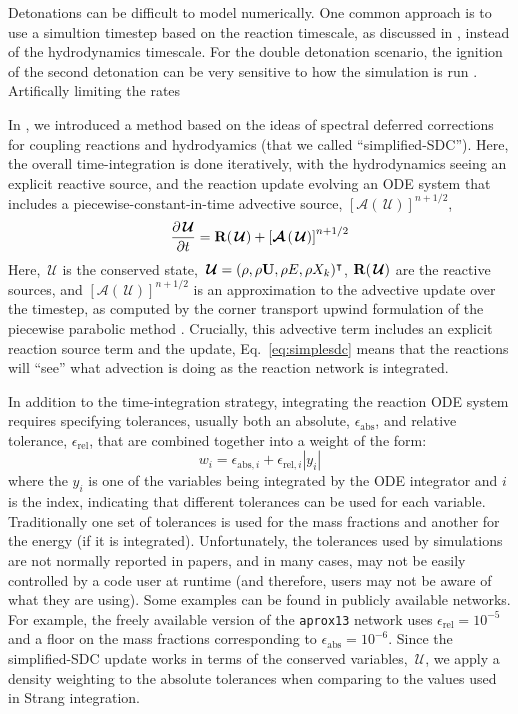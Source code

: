 \documentclass[modern]{aastex631}
\newcommand{\Ub}{{\bf{U}}}
\newcommand{\ddt}[1]{{\frac{{\partial#1}}{\partial t}}}
\newcommand{\Uc}{{\,\bm{\mathcal{U}}}}
\newcommand{\Rb}{{\bf R}}
\newcommand{\Adv}[1]{{\left [\boldsymbol{\mathcal{A}} \left(#1\right)\right]}}
\newcommand{\MarginPar}[1]{
    \marginpar{\vskip-\baselineskip%
               \raggedright%
               \tiny\sffamily%
               {\color{red}\hrule%
               \smallskip%
               #1\par%
               \smallskip%
               \hrule}}%
}
\begin{document}
Detonations can be difficult to model numerically.  One common
approach is to use a simultion timestep based on the reaction
timescale, as discussed in \citet{prometheus}, instead of the
hydrodynamics timescale.  For the double detonation scenario, the
ignition of the second detonation can be very sensitive to how the
simulation is run \MarginPar{refs}.  Artifically limiting the
rates \MarginPar{ref}

In \citet{castro_simple_sdc}, we introduced a method based on the
ideas of spectral deferred corrections for coupling reactions and
hydrodyamics (that we called ``simplified-SDC'').  Here, the overall
time-integration is done iteratively, with the hydrodynamics seeing an
explicit reactive source, and the reaction update evolving an ODE
system that includes a piecewise-constant-in-time advective source,
$\Adv{\Uc}^{n+1/2}$,
\begin{equation}
\label{eq:simplesdc}
\ddt{\Uc} = \Rb(\Uc) + \Adv{\Uc}^{n+1/2}
\end{equation}
Here, $\Uc$ is the conserved state, $\Uc = (\rho, \rho \Ub, \rho E,
\rho X_k)^\intercal$, $\Rb(\Uc)$ are the reactive sources, and
$\Adv{\Uc}^{n+1/2}$ is an approximation to the advective update over
the timestep, as computed by the corner transport upwind formulation
of the piecewise parabolic method
\citep{ppmunsplit,millercolella:2002,ppm}. Crucially, this advective
term includes an explicit reaction source term and the update,
Eq.~\ref{eq:simplesdc} means that the reactions will ``see'' what
advection is doing as the reaction network is integrated.

In addition to the time-integration strategy, integrating the reaction
ODE system requires specifying tolerances, usually both an absolute, $\epsilon_\mathrm{abs}$, and relative tolerance, $\epsilon_\mathrm{rel}$, that are combined together into a weight of the form:
\begin{equation}
w_i = \epsilon_{\mathrm{abs},i} + \epsilon_{\mathrm{rel},i} |y_i|
\end{equation}
where the $y_i$ is one of the variables being integrated by the ODE
integrator and $i$ is the index, indicating that different tolerances
can be used for each variable.  Traditionally one set of tolerances is
used for the mass fractions and another for the energy (if it is
integrated).  Unfortunately, the tolerances used by simulations are
not normally reported in papers, and in many cases, may not be easily
controlled by a code user at runtime (and therefore, users may not be
aware of what they are using).  Some examples can be found in publicly
available networks.  For example, the freely available version of the
{\tt aprox13} network uses $\epsilon_\mathrm{rel} = 10^{-5}$ and a
floor on the mass fractions corresponding to $\epsilon_\mathrm{abs} =
10^{-6}$.  Since the simplified-SDC update works in terms of the
conserved variables, $\Uc$, we apply a density weighting to the absolute tolerances when comparing to the values used in Strang integration.
\end{document}
